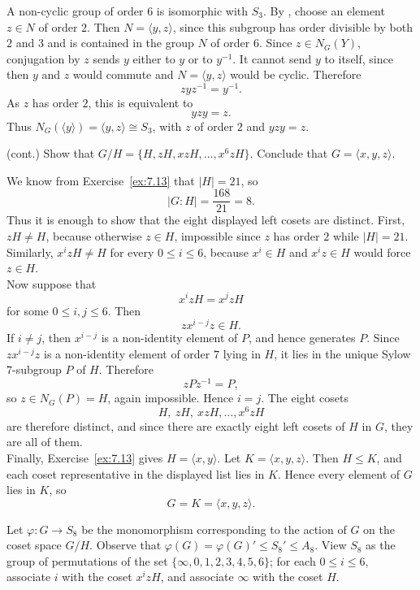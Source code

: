 \documentclass[../Odyssey_Project.tex]{subfiles}
\begin{document}
\begin{solution}
    A non-cyclic group of order $6$ is isomorphic with $S_3$. By , choose an element $z\in N$ of order $2$. Then $N=\langle y,z\rangle$, since this subgroup has order divisible by both $2$ and $3$ and is contained in the group $N$ of order $6$. Since $z\in N_G(Y)$, conjugation by $z$ sends $y$ either to $y$ or to $y^{-1}$. It cannot send $y$ to itself, since then $y$ and $z$ would commute and $N=\langle y,z\rangle$ would be cyclic. Therefore
    \[
        zyz^{-1}=y^{-1}.
    \]
    As $z$ has order $2$, this is equivalent to
    \[
        yzy=z.
    \]
    Thus $N_G(\langle y\rangle)=\langle y,z\rangle\cong S_3$, with $z$ of order $2$ and $yzy=z$.
\end{solution}

\begin{exercise}
\label{ex:7.15}
(cont.) Show that $G/H = \{H, zH, xzH, \ldots, x^6 zH\}$. Conclude that $G = \langle x, y, z \rangle$.
\end{exercise}
\begin{solution}
    We know from Exercise~\ref{ex:7.13} that $|H|=21$, so
    \[
        |G:H|=\frac{168}{21}=8.
    \]
    Thus it is enough to show that the eight displayed left cosets are distinct. First, $zH\neq H$, because otherwise $z\in H$, impossible since $z$ has order $2$ while $|H|=21$. Similarly, $x^i zH\neq H$ for every $0\leq i\leq 6$, because $x^i\in H$ and $x^iz\in H$ would force $z\in H$.\\
    Now suppose that
    \[
        x^i zH=x^j zH
    \]
    for some $0\leq i,j\leq 6$. Then
    \[
        z x^{i-j}z\in H.
    \]
    If $i\neq j$, then $x^{i-j}$ is a non-identity element of $P$, and hence generates $P$. Since $z x^{i-j}z$ is a non-identity element of order $7$ lying in $H$, it lies in the unique Sylow $7$-subgroup $P$ of $H$. Therefore
    \[
        zPz^{-1}=P,
    \]
    so $z\in N_G(P)=H$, again impossible. Hence $i=j$. The eight cosets
    \[
        H,\ zH,\ xzH,\ldots,x^6zH
    \]
    are therefore distinct, and since there are exactly eight left cosets of $H$ in $G$, they are all of them.\\
    Finally, Exercise~\ref{ex:7.13} gives $H=\langle x,y\rangle$. Let $K=\langle x,y,z\rangle$. Then $H\leq K$, and each coset representative in the displayed list lies in $K$. Hence every element of $G$ lies in $K$, so
    \[
        G=K=\langle x,y,z\rangle.
    \]
\end{solution}

\noindent Let $\varphi \colon G \to S_8$ be the monomorphism corresponding to the action of $G$ on the coset space $G/H$. Observe that $\varphi(G) = \varphi(G)' \leq S_8' \leq A_8$. View $S_8$ as the group of permutations of the set $\{\infty, 0, 1, 2, 3, 4, 5, 6\}$; for each $0 \leq i \leq 6$, associate $i$ with the coset $x^i z H$, and associate $\infty$ with the coset $H$.
\end{document}
